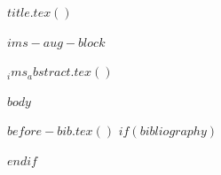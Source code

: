 \documentclass[$if(ims-journal)$$ims-journal$$else$sts$endif$]{imsart}
\begin{document}
\begin{frontmatter}

$title.tex()$

\begin{aug}
$ims-aug-block$
\end{aug}

$_ims_abstract.tex()$

\end{frontmatter}

$body$

$before-bib.tex()$
$if(bibliography)$


$endif$
\end{document}
